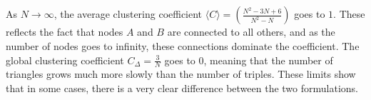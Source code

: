 \documentclass {article}
\begin{document}
\subsection{}
As $ N \to \infty $, the average clustering coefficient $ \langle C \rangle = (\frac{ N^2 - 3N + 6 }{ N^2 - N }) $ goes to $ 1 $. These reflects the fact that nodes $ A $ and $ B $ are connected to all others, and as the number of nodes goes to infinity, these connections dominate the coefficient. The global clustering coefficient $ C_{\Delta} = \frac{ 3 }{ N } $ goes to 0, meaning that the number of triangles grows much more slowly than the number of triples. These limits show that in some cases, there is a very clear difference between the two formulations. 

\newpage
\end{document}
